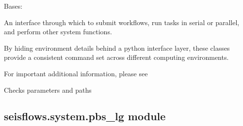 \documentclass[letterpaper,10pt,english]{sphinxmanual}
\begin{document}
\begin{fulllineitems}
\label{\detokenize{ref/seisflows.system:seisflows.system.multithreaded.multithreaded}}
Bases: {\hyperref[\detokenize{ref/seisflows.system:seisflows.system.multicore.multicore}]{}}

An interface through which to submit workflows, run tasks in serial or
parallel, and perform other system functions.

By hiding environment details behind a python interface layer, these
classes provide a consistent command set across different computing
environments.

For important additional information, please see

\begin{fulllineitems}
\label{\detokenize{ref/seisflows.system:seisflows.system.multithreaded.multithreaded.check}}
Checks parameters and paths

\end{fulllineitems}


\end{fulllineitems}



\subsection{seisflows.system.pbs\_lg module}
\label{\detokenize{ref/seisflows.system:module-seisflows.system.pbs_lg}}\label{\detokenize{ref/seisflows.system:seisflows-system-pbs-lg-module}}
\end{document}
